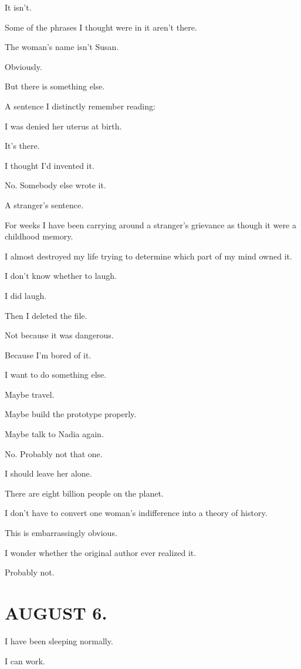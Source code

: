 \documentclass[11pt,oneside]{book}
\begin{document}
It isn't.

Some of the phrases I thought were in it aren't there.

The woman's name isn't Susan.

Obviously.

But there is something else.

A sentence I distinctly remember reading:

I was denied her uterus at birth.

It's there.

I thought I'd invented it.

No. Somebody else wrote it.

A stranger's sentence.

For weeks I have been carrying around a stranger's grievance as though it were a childhood memory.

I almost destroyed my life trying to determine which part of my mind owned it.

I don't know whether to laugh.

I did laugh.

Then I deleted the file.

Not because it was dangerous.

Because I'm bored of it.

I want to do something else.

Maybe travel.

Maybe build the prototype properly.

Maybe talk to Nadia again.

No. Probably not that one.

I should leave her alone.

There are eight billion people on the planet.

I don't have to convert one woman's indifference into a theory of history.

This is embarrassingly obvious.

I wonder whether the original author ever realized it.

Probably not.

\section*{AUGUST 6.}

I have been sleeping normally.

I can work.
\end{document}
